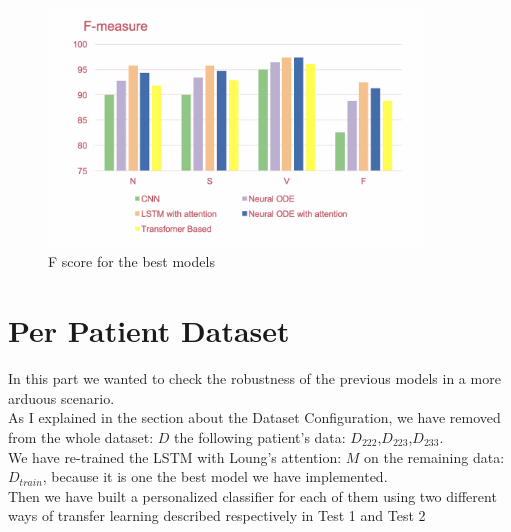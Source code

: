 \documentclass[LaM,binding=0.6cm]{sapthesis}
\begin{document}
\begin{figure}[H]  \centering
    \includegraphics[width=100mm,scale=0.7]{fscore}
    \caption{F score for the best models }
    \label{fig:fscore}
\end{figure}


\section{Per Patient Dataset}
In this part we wanted to check the robustness of the previous models in a more arduous scenario.\\As I explained in the section about the Dataset Configuration, we have removed from the whole dataset: $D$ the following patient's data: $D_{222}$,$D_{223}$,$D_{233}$.\\We have re-trained the LSTM with Loung's attention: $M$ on the remaining data: $D_{train}$, because it is one the best model we have implemented.\\Then we have built a personalized classifier for each of them using two different ways of transfer learning described respectively in Test 1 and Test 2
\end{document}
